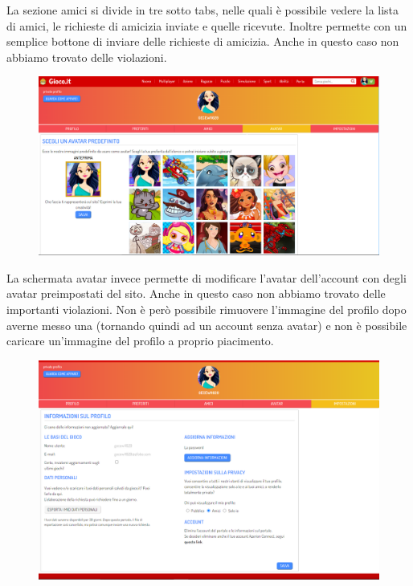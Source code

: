 \documentclass[../Report.tex]{subfiles}
\begin{document}
    La sezione amici si divide in tre sotto tabs, nelle quali è possibile vedere la lista di amici, le richieste di amicizia inviate e quelle ricevute. Inoltre permette con un semplice bottone di inviare delle richieste di amicizia. Anche in questo caso non abbiamo trovato delle violazioni. 

    \begin{figure}[H]
        \includegraphics[width=\linewidth]{Assestment16.png}
        \centering
    \end{figure}

    La schermata avatar invece permette di modificare l’avatar dell’account con degli avatar preimpostati del sito. Anche in questo caso non abbiamo trovato delle importanti violazioni. Non è però possibile rimuovere l’immagine del profilo dopo averne messo una (tornando quindi ad un account senza avatar) e non è possibile caricare un’immagine del profilo a proprio piacimento. 

    \begin{figure}[H]
        \includegraphics[width=\linewidth]{Assestment17.png}
        \centering
    \end{figure}
\end{document}

